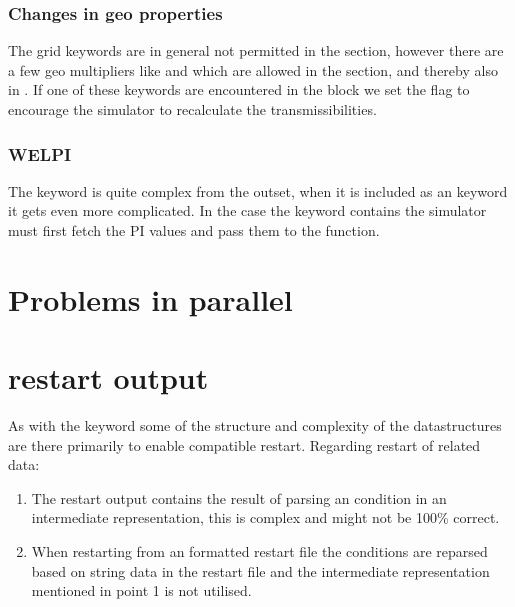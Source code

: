 \subsubsection{Changes in geo properties}
The grid keywords are in general not permitted in the  section,
however there are a few geo multipliers like  and  which
are allowed in the  section, and thereby also in \actionx{}. If one
of these keywords are encountered in the \actionx{} block we set the flag
 to encourage the
simulator to recalculate the transmissibilities.


\subsubsection{WELPI}
The  keyword is quite complex from the outset, when it is included as
an \actionx{} keyword it gets even more complicated. In the case the \actionx{}
keyword contains  the simulator must first fetch the PI values and
pass them to the  function.


\section{Problems in parallel}

\section{\actionx{} restart output}
As with the \udq{} keyword some of the structure and complexity of the
\actionx{} datastructures are there primarily to enable \eclipse{} compatible
restart. Regarding restart of \actionx{} related data:
\begin{enumerate}
  \item The restart output contains the result of parsing an \actionx{}
    condition in an intermediate representation, this is complex and might not
    be 100\% correct.
  \item When restarting \flow{} from an \eclipse{} formatted restart file the
    \actionx{} conditions are reparsed based on string data in the restart file
    and the intermediate representation mentioned in point 1 is not utilised.
\end{enumerate}
